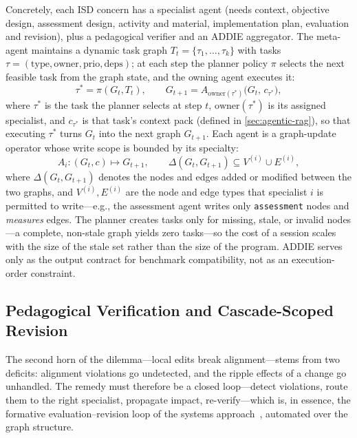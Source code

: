 Concretely, each ISD concern has a specialist agent (needs context, objective design, assessment design, activity and material, implementation plan, evaluation and revision), plus a pedagogical verifier and an ADDIE aggregator. The meta-agent maintains a dynamic task graph $T_t = \{\tau_1, \dots, \tau_k\}$ with tasks $\tau = (\mathrm{type}, \mathrm{owner}, \mathrm{prio}, \mathrm{deps})$; at each step the planner policy $\pi$ selects the next feasible task from the graph state, and the owning agent executes it:
\[
\tau^* = \pi(G_t, T_t), \qquad G_{t+1} = A_{\mathrm{owner}(\tau^*)}\big(G_t,\, c_{\tau^*}\big),
\]
where $\tau^*$ is the task the planner selects at step $t$, $\mathrm{owner}(\tau^*)$ is its assigned specialist, and $c_{\tau^*}$ is that task's context pack (defined in \cref{sec:agentic-rag}), so that executing $\tau^*$ turns $G_t$ into the next graph $G_{t+1}$. Each agent is a graph-update operator whose write scope is bounded by its specialty:
\[
A_i : (G_t, c) \mapsto G_{t+1}, \qquad \Delta(G_t, G_{t+1}) \subseteq V^{(i)} \cup E^{(i)},
\]
where $\Delta(G_t, G_{t+1})$ denotes the nodes and edges added or modified between the two graphs, and $V^{(i)}, E^{(i)}$ are the node and edge types that specialist $i$ is permitted to write---e.g., the assessment agent writes only \texttt{assessment} nodes and \textsl{measures} edges. The planner creates tasks only for missing, stale, or invalid nodes---a complete, non-stale graph yields zero tasks---so the cost of a session scales with the size of the stale set rather than the size of the program. ADDIE serves only as the output contract for benchmark compatibility, not as an execution-order constraint.

\subsection{Pedagogical Verification and Cascade-Scoped Revision}
\label{sec:verification}

The second horn of the dilemma---local edits break alignment---stems from two deficits: alignment violations go undetected, and the ripple effects of a change go unhandled. The remedy must therefore be a closed loop---detect violations, route them to the right specialist, propagate impact, re-verify---which is, in essence, the formative evaluation--revision loop of the systems approach~\cite{dick1978systematic}, automated over the graph structure.

